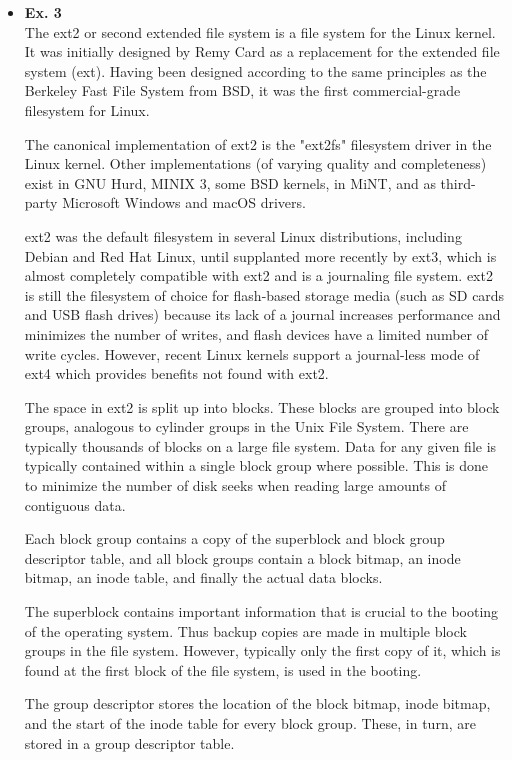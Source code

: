 \documentclass{article}
\begin{document}
\begin{itemize}
{. Their order is not certain.}



\item {\bf Ex. 3}\\
The ext2 or second extended file system is a file system for the Linux kernel. It was initially designed by Remy Card as a replacement for the extended file system (ext). Having been designed according to the same principles as the Berkeley Fast File System from BSD, it was the first commercial-grade filesystem for Linux.

The canonical implementation of ext2 is the "ext2fs" filesystem driver in the Linux kernel. Other implementations (of varying quality and completeness) exist in GNU Hurd, MINIX 3, some BSD kernels, in MiNT, and as third-party Microsoft Windows and macOS drivers.

ext2 was the default filesystem in several Linux distributions, including Debian and Red Hat Linux, until supplanted more recently by ext3, which is almost completely compatible with ext2 and is a journaling file system. ext2 is still the filesystem of choice for flash-based storage media (such as SD cards and USB flash drives) because its lack of a journal increases performance and minimizes the number of writes, and flash devices have a limited number of write cycles. However, recent Linux kernels support a journal-less mode of ext4 which provides benefits not found with ext2.

The space in ext2 is split up into blocks. These blocks are grouped into block groups, analogous to cylinder groups in the Unix File System. There are typically thousands of blocks on a large file system. Data for any given file is typically contained within a single block group where possible. This is done to minimize the number of disk seeks when reading large amounts of contiguous data.

Each block group contains a copy of the superblock and block group descriptor table, and all block groups contain a block bitmap, an inode bitmap, an inode table, and finally the actual data blocks.

The superblock contains important information that is crucial to the booting of the operating system. Thus backup copies are made in multiple block groups in the file system. However, typically only the first copy of it, which is found at the first block of the file system, is used in the booting.

The group descriptor stores the location of the block bitmap, inode bitmap, and the start of the inode table for every block group. These, in turn, are stored in a group descriptor table.


\end{itemize}
\end{document}
